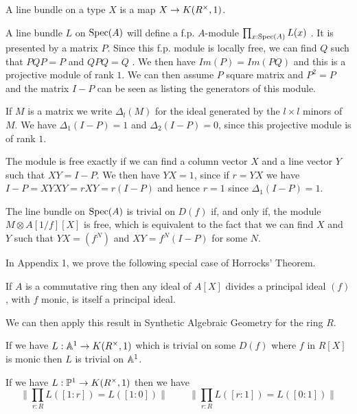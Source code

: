 A line bundle on a type $X$ is a map $X\rightarrow K(R^{\times},1)$.


\medskip

 A line bundle $L$ on $\operatorname{Spec}(A)$ will define a f.p. $A$-module $\prod_{x:\operatorname{Spec}(A)}L(x)$ \cite{draft}.
It is presented by a matrix $P$.
Since this f.p. module is locally free, we can find $Q$ such that $PQP = P$ and
$QPQ = Q$ \cite{lombardi-quitte}. We then have $Im(P) = Im(PQ)$ and this is a projective module of rank $1$. We can then assume $P$ square matrix and
$P^2 = P$ and the matrix $I-P$ can  be seen as listing the generators of this module.

If $M$ is a matrix we write $\Delta_l(M)$ for the ideal generated by the $l\times l$ minors of
$M$. We have $\Delta_1(I-P) = 1$ and $\Delta_2(I-P) = 0$, since this projective module is of rank $1$.

The module is free exactly if we can find a column vector $X$ and a line vector $Y$ such that
$XY = I-P$. We then have $YX = 1$, since if $r = YX$ we have $I-P = XYXY = rXY = r(I-P)$ and
hence $r = 1$ since $\Delta_1(I-P) = 1$.



\medskip

The line bundle on $\operatorname{Spec}(A)$ is trivial on $D(f)$ if, and only if, the module $M\otimes A[1/f][X]$ is free, which
is equivalent to the fact that we can find $X$ and $Y$ such that $YX = (f^N)$ and $XY = f^N(I-P)$ for some $N$.

In Appendix 1, we prove the following special case of Horrocks' Theorem.

\begin{lemma}\label{Horrocks}
  If $A$ is a commutative ring
  then any ideal of $A[X]$ divides a principal ideal $(f)$, with $f$ monic, is itself a principal ideal.
\end{lemma}

We can then apply this result in Synthetic Algebraic Geometry for the ring $R$.

\begin{proposition}
  If we have $L:\mathbb{A}^1\rightarrow K(R^{\times},1)$ which is trivial on some $D(f)$ where $f$ in $R[X]$ is monic
  then $L$ is trivial on $\mathbb{A}^1$.
\end{proposition}

\begin{corollary}\label{c1}
  If we have $L:\mathbb{P}^1\rightarrow K(R^{\times},1)$ then we have
  $$\|{\prod_{r:R}L([1:r]) = L([1:0])}\|\,\,\,\,\,\,\,\,\,\,\,\,\,\|{\prod_{r:R}L([r:1]) = L([0:1])}\|$$
\end{corollary}

